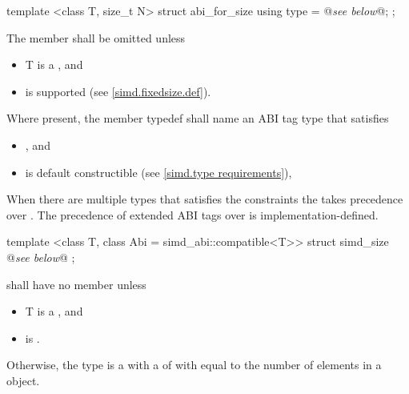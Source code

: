 \begin{itemdecl}
template <class T, size_t N> struct abi_for_size { using type = @\emph{see below}@; };
\end{itemdecl}
\begin{itemdescr}
  \pnum The member  shall be omitted unless
  \begin{itemize}
    \item \type T is a \realArithmeticType{}, and
    \item \fixedsizeN is supported (see \ref{simd.fixedsize.def}).
  \end{itemize}

  \pnum Where present, the member typedef  shall name an ABI tag type that satisfies
  \begin{itemize}
    \item {}, and
    \item \simd[<T, type>] is default constructible (see \ref{simd.type requirements}),
  \end{itemize}

  When there are multiple types that satisfies the constraints the 
   takes precedence over \fixedsize{}.
  The precedence of extended ABI tags over \fixedsizeN is implementation-defined.
\end{itemdescr}

\begin{itemdecl}
template <class T, class Abi = simd_abi::compatible<T>> struct simd_size { @\emph{see below}@ };
\end{itemdecl}
\begin{itemdescr}
  \pnum\label{simd_size}%
   shall have no member  unless
  \begin{itemize}
    \item \type T is a \realArithmeticType, and
    \item {} is \true.
  \end{itemize}

  \pnum
  Otherwise, the type  is a \BinaryTypeTrait with a \BaseCharacteristic of  with  equal to the number of elements in a \simd[<T, Abi>] object.

\end{itemdescr}

